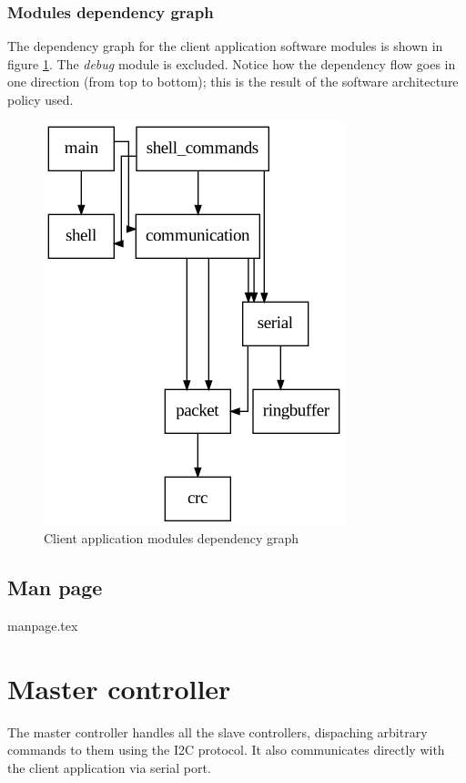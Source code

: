 \documentclass[binding=0.6cm,Lau]{sapthesis}
\begin{document}
\subsection{Modules dependency graph}
The dependency graph for the client application software modules is shown in
figure \ref{img:client-deps-graph}. The \emph{debug} module is excluded. Notice
how the dependency flow goes in one direction (from top to bottom); this is the
result of the software architecture policy used.
\begin{figure}[hbp]
\begin{centering}
  \includegraphics[scale=0.5]{img/client-deps}
  \caption{Client application modules dependency graph}
  \label{img:client-deps-graph}
\end{centering}
\end{figure}

\section{Man page}
\label{sec:client-manpage}
{manpage.tex}


\chapter{Master controller}
\label{ch:master}
The master controller handles all the slave controllers, dispaching arbitrary
commands to them using the I2C protocol. It also communicates directly with the
client application via serial port.
\end{document}

